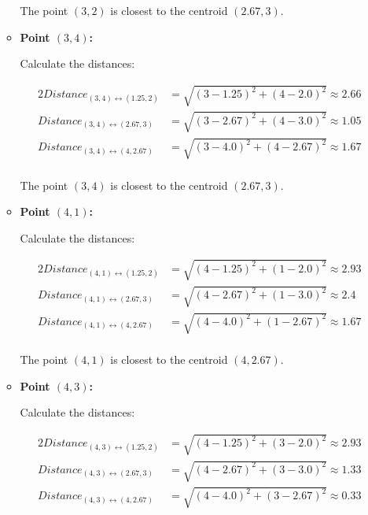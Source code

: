 \documentclass[
english,
smallborders
]{i6prcsht}
\begin{document}
\begin{solution}
\begin{enumerate}
\begin{itemize}
			            The point $(3,2)$ is closest to the centroid $(2.67,3)$.

			      \item \textbf{Point $(3,4)$:}

			            Calculate the distances:

			            \begin{alignat*}{2}
				            Distance_{(3,4)\leftrightarrow(1.25,2)} & = \sqrt{(3-1.25)^2+(4-2.0)^2} \approx 2.66 \\
				            Distance_{(3,4)\leftrightarrow(2.67,3)} & = \sqrt{(3-2.67)^2+(4-3.0)^2} \approx 1.05 \\
				            Distance_{(3,4)\leftrightarrow(4,2.67)} & = \sqrt{(3-4.0)^2+(4-2.67)^2} \approx 1.67 \\
			            \end{alignat*}

			            The point $(3,4)$ is closest to the centroid $(2.67,3)$.

			      \item \textbf{Point $(4,1)$:}

			            Calculate the distances:

			            \begin{alignat*}{2}
				            Distance_{(4,1)\leftrightarrow(1.25,2)} & = \sqrt{(4-1.25)^2+(1-2.0)^2} \approx 2.93 \\
				            Distance_{(4,1)\leftrightarrow(2.67,3)} & = \sqrt{(4-2.67)^2+(1-3.0)^2} \approx 2.4  \\
				            Distance_{(4,1)\leftrightarrow(4,2.67)} & = \sqrt{(4-4.0)^2+(1-2.67)^2} \approx 1.67 \\
			            \end{alignat*}

			            The point $(4,1)$ is closest to the centroid $(4,2.67)$.

			      \item \textbf{Point $(4,3)$:}

			            Calculate the distances:

			            \begin{alignat*}{2}
				            Distance_{(4,3)\leftrightarrow(1.25,2)} & = \sqrt{(4-1.25)^2+(3-2.0)^2} \approx 2.93 \\
				            Distance_{(4,3)\leftrightarrow(2.67,3)} & = \sqrt{(4-2.67)^2+(3-3.0)^2} \approx 1.33 \\
				            Distance_{(4,3)\leftrightarrow(4,2.67)} & = \sqrt{(4-4.0)^2+(3-2.67)^2} \approx 0.33 \\
			            \end{alignat*}


\end{itemize}
\end{enumerate}
\end{solution}
\end{document}
